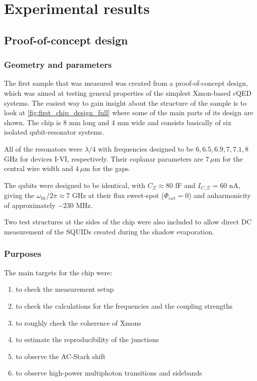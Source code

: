 \documentclass[12pt, twoside]{report}
\numberwithin{equation}{section}
\begin{document}

\tableofcontents







\chapter{Experimental results}

\section{Proof-of-concept design}

\subsection{Geometry and parameters}

The first sample that was measured was created from a proof-of-concept design, which was aimed at testing general properties of the simplest Xmon-based cQED systems. The easiest way to gain insight about the structure of the sample is to look at \autoref{fig:first_chip_design_full} where some of the main parts of its design are shown. The chip is 8 mm long and 4 mm wide and consists basically of six isolated qubit-resonator systems. 

All of the resonators were $\lambda/4$ with frequencies designed to be $6, 6.5, 6.9,7,7.1,8$ GHz for devices I-VI, respectively. Their coplanar parameters are $7\,\mu$m for the central wire width and $4\,\mu$m for the gaps.

The qubits were designed to be identical, with $C_\Sigma \approx 80$ fF and $I_{C, \Sigma} = 60$ nA, giving the $\omega_{01}/2\pi \approx 7$ GHz at their flux sweet-spot ($\Phi_{ext}=0$) and anharmonicity of approximately $-230$ MHz.

Two test structures at the sides of the chip were also included to allow direct DC measurement of the SQUIDs created during the shadow evaporation.

\subsection{Purposes}

The main targets for the chip were:
\begin{enumerate}[label=(\alph*), leftmargin=1.5cm]
\itemsep0pt
 \item to check the measurement setup
 \item to check the calculations for the frequencies and the coupling strengths
 \item to roughly check the coherence of Xmons
 \item to estimate the reproducibility of the junctions 
 \item to observe the AC-Stark shift 
 \item to observe high-power multiphoton transitions and sidebands
\end{enumerate}
\end{document}
